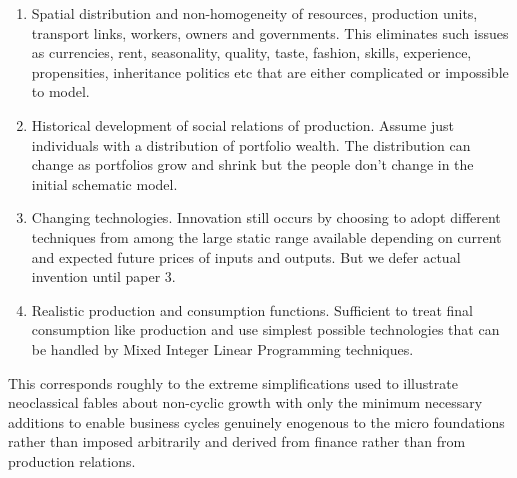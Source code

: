 \documentclass{article}
\begin{document}
\begin{enumerate}
\def\labelenumi{\arabic{enumi}.}
\item
  Spatial distribution and non-homogeneity of resources, production
  units, transport links, workers, owners and governments. This
  eliminates such issues as currencies, rent, seasonality, quality,
  taste, fashion, skills, experience, propensities, inheritance politics
  etc that are either complicated or impossible to model.
\item
  Historical development of social relations of production. Assume just
  individuals with a distribution of portfolio wealth. The distribution
  can change as portfolios grow and shrink but the people don't change
  in the initial schematic model.
\item
  Changing technologies. Innovation still occurs by choosing to adopt
  different techniques from among the large static range available
  depending on current and expected future prices of inputs and outputs.
  But we defer actual invention until paper 3.
\item
  Realistic production and consumption functions. Sufficient to treat
  final consumption like production and use simplest possible
  technologies that can be handled by Mixed Integer Linear Programming
  techniques.
\end{enumerate}

This corresponds roughly to the extreme simplifications used to
illustrate neoclassical fables about non-cyclic growth with only the
minimum necessary additions to enable business cycles genuinely
enogenous to the micro foundations rather than imposed arbitrarily and
derived from finance rather than from production relations.
\end{document}
